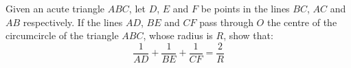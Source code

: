 Given an acute triangle $ABC$,  let $D$,  $E$ and $F$ be points in the lines $BC$,  $AC$ and $AB$ respectively. If the lines $AD$,  $BE$ and $CF$ pass through $O$ the centre of the circumcircle of the triangle $ABC$,  whose radius is $R$,  show that:\[\frac{1}{AD}+\frac{1}{BE}+\frac{1}{CF}=\frac{2}{R}\]